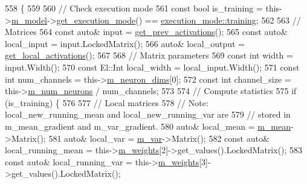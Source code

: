 \begin{DoxyCode}
558                         \{
559 
560     \textcolor{comment}{// Check execution mode}
561     \textcolor{keyword}{const} \textcolor{keywordtype}{bool} is\_training = this->\hyperlink{classlbann_1_1Layer_a3d9315e99574166f2f33e37b572021d2}{m\_model}->\hyperlink{classlbann_1_1model_addb40597cf29aa6d31b6a7d09ef48608}{get\_execution\_mode}() == 
      \hyperlink{base_8hpp_a2781a159088df64ed7d47cc91c4dc0a8ac185ddac8b5a8f5aa23c5b80bc12d214}{execution\_mode::training};
562 
563     \textcolor{comment}{// Matrices}
564     \textcolor{keyword}{const} \textcolor{keyword}{auto}& input = \hyperlink{classlbann_1_1Layer_a45853df73a2e72bfaa774665a0f37ed7}{get\_prev\_activations}();
565     \textcolor{keyword}{const} \textcolor{keyword}{auto}& local\_input = input.LockedMatrix();
566     \textcolor{keyword}{auto}& local\_output = \hyperlink{classlbann_1_1Layer_a4248f27acebf72b7b7b3ee39c8bcb62a}{get\_local\_activations}();
567 
568     \textcolor{comment}{// Matrix parameters}
569     \textcolor{keyword}{const} \textcolor{keywordtype}{int} width = input.Width();
570     \textcolor{keyword}{const} El::Int local\_width = local\_input.Width();
571     \textcolor{keyword}{const} \textcolor{keywordtype}{int} num\_channels = this->\hyperlink{classlbann_1_1Layer_abb34bb8031f57a483e2e327a5f229f48}{m\_neuron\_dims}[0];
572     \textcolor{keyword}{const} \textcolor{keywordtype}{int} channel\_size = this->\hyperlink{classlbann_1_1Layer_a6b5ebc8a7d9329d8a773ed787e7b41d8}{m\_num\_neurons} / num\_channels;
573 
574     \textcolor{comment}{// Compute statistics}
575     \textcolor{keywordflow}{if} (is\_training) \{
576 
577       \textcolor{comment}{// Local matrices}
578       \textcolor{comment}{// Note: local\_new\_running\_mean and local\_new\_running\_var are}
579       \textcolor{comment}{// stored in m\_mean\_gradient and m\_var\_gradient.}
580       \textcolor{keyword}{auto}& local\_mean = \hyperlink{classlbann_1_1batch__normalization_a7c0db2315a4c5bb662da7a740ae76e24}{m\_mean}->Matrix();
581       \textcolor{keyword}{auto}& local\_var = \hyperlink{classlbann_1_1batch__normalization_aba533149e4179378ab23443b0a2a7dc6}{m\_var}->Matrix();
582       \textcolor{keyword}{const} \textcolor{keyword}{auto}& local\_running\_mean = this->\hyperlink{classlbann_1_1Layer_a7954e30fbf9100a6ba4b56d02767a469}{m\_weights}[2]->get\_values().LockedMatrix();
583       \textcolor{keyword}{const} \textcolor{keyword}{auto}& local\_running\_var = this->\hyperlink{classlbann_1_1Layer_a7954e30fbf9100a6ba4b56d02767a469}{m\_weights}[3]->get\_values().LockedMatrix();

\end{DoxyCode}

